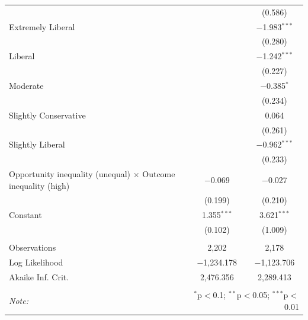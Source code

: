 \begin{table}[H]
\begin{tabular}{@{\extracolsep{5pt}}lcc}
  &  & (0.586) \\ 
  Extremely Liberal &  & $-$1.983$^{***}$ \\ 
  &  & (0.280) \\ 
  Liberal &  & $-$1.242$^{***}$ \\ 
  &  & (0.227) \\ 
  Moderate &  & $-$0.385$^{*}$ \\ 
  &  & (0.234) \\ 
  Slightly Conservative &  & 0.064 \\ 
  &  & (0.261) \\ 
  Slightly Liberal &  & $-$0.962$^{***}$ \\ 
  &  & (0.233) \\ 
  Opportunity inequality (unequal) × Outcome inequality (high) & $-$0.069 & $-$0.027 \\ 
  & (0.199) & (0.210) \\ 
  Constant & 1.355$^{***}$ & 3.621$^{***}$ \\ 
  & (0.102) & (1.009) \\ 
 \hline \\[-1.8ex] 
Observations & 2,202 & 2,178 \\ 
Log Likelihood & $-$1,234.178 & $-$1,123.706 \\ 
Akaike Inf. Crit. & 2,476.356 & 2,289.413 \\ 
\hline 
\hline \\[-1.8ex] 
\textit{Note:}  & \multicolumn{2}{r}{$^{*}$p$<$0.1; $^{**}$p$<$0.05; $^{***}$p$<$0.01} \\ 
\end{tabular} 
\end{table} 
